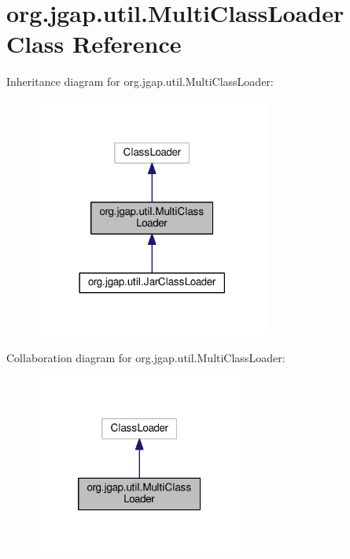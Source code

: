 \hypertarget{classorg_1_1jgap_1_1util_1_1_multi_class_loader}{\section{org.\-jgap.\-util.\-Multi\-Class\-Loader Class Reference}
\label{classorg_1_1jgap_1_1util_1_1_multi_class_loader}
}


Inheritance diagram for org.\-jgap.\-util.\-Multi\-Class\-Loader\-:
\nopagebreak
\begin{figure}[H]
\begin{center}
\leavevmode
\includegraphics[width=218pt]{classorg_1_1jgap_1_1util_1_1_multi_class_loader__inherit__graph}
\end{center}
\end{figure}


Collaboration diagram for org.\-jgap.\-util.\-Multi\-Class\-Loader\-:
\nopagebreak
\begin{figure}[H]
\begin{center}
\leavevmode
\includegraphics[width=194pt]{classorg_1_1jgap_1_1util_1_1_multi_class_loader__coll__graph}
\end{center}
\end{figure}

